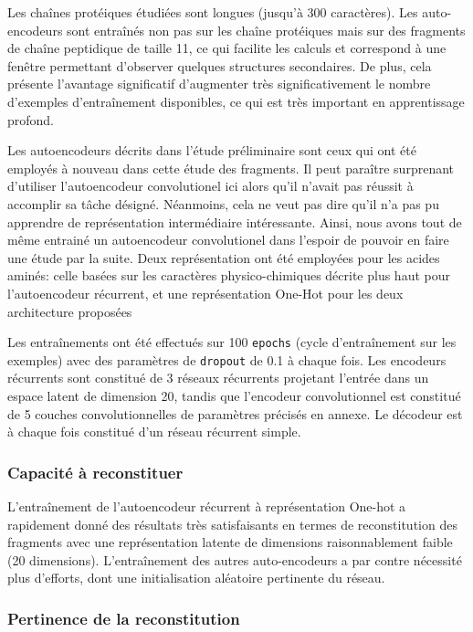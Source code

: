\documentclass[a4paper, 11pt, onecolumn]{article}
\begin{document}
Les chaînes protéiques étudiées sont longues (jusqu'à 300 caractères). Les
auto-encodeurs sont entraînés non pas sur les chaîne protéiques mais sur des
fragments de chaîne peptidique de taille 11, ce qui facilite les calculs et
correspond à une fenêtre permettant d'observer quelques structures secondaires.
De plus, cela présente l'avantage significatif d'augmenter très
significativement le nombre d'exemples d'entraînement disponibles, ce qui est
très important en apprentissage profond. 

Les autoencodeurs décrits dans l'étude
préliminaire sont ceux qui ont été employés à nouveau dans cette étude des
fragments. Il peut paraître surprenant d'utiliser l'autoencodeur convolutionel
ici alors qu'il n'avait pas réussit à accomplir sa tâche désigné. Néanmoins,
cela ne veut pas dire qu'il n'a pas pu apprendre de représentation intermédiaire
intéressante. Ainsi, nous avons tout de même entrainé un autoencodeur
convolutionel dans l'espoir de pouvoir en faire une étude par la suite. Deux
représentation ont été employées pour les acides aminés: celle basées sur les
caractères physico-chimiques décrite plus haut pour l'autoencodeur récurrent, et
une représentation One-Hot pour les deux architecture proposées

Les entraînements ont été effectués sur 100 \texttt{epochs} (cycle
d'entraînement sur les exemples) avec des paramètres de \texttt{dropout} de 0.1
à chaque fois. Les encodeurs récurrents sont constitué de 3 réseaux récurrents
projetant l'entrée dans un espace latent de dimension 20,
tandis que l'encodeur convolutionnel est constitué de 5 couches convolutionnelles
de paramètres précisés en annexe. Le décodeur est à chaque fois constitué d'un
réseau récurrent simple.

\subsubsection{Capacité à reconstituer}

L'entraînement de l'autoencodeur récurrent à représentation One-hot a rapidement donné des résultats très
satisfaisants en termes de reconstitution des fragments  avec une représentation
latente de dimensions raisonnablement faible (20 dimensions). L'entraînement des
autres auto-encodeurs a par contre nécessité plus d'efforts, dont une
initialisation aléatoire pertinente du réseau.

\subsubsection{Pertinence de la reconstitution}
\end{document}
